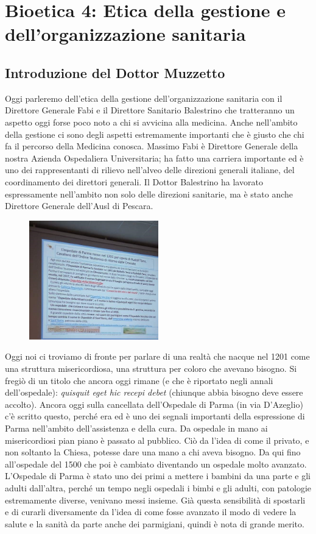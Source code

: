 \section{Bioetica 4: Etica della gestione e dell'organizzazione sanitaria}

\subsection{Introduzione del Dottor Muzzetto}

Oggi parleremo dell'etica della gestione dell'organizzazione sanitaria
con il Direttore Generale Fabi e il Direttore Sanitario Balestrino che
tratteranno un aspetto oggi forse poco noto a chi si avvicina alla
medicina. Anche nell'ambito della gestione ci sono degli aspetti
estremamente importanti che è giusto che chi fa il percorso della
Medicina conosca. Massimo Fabi è Direttore Generale della nostra Azienda
Ospedaliera Universitaria; ha fatto una carriera importante ed è uno dei
rappresentanti di rilievo nell'alveo delle direzioni generali italiane,
del coordinamento dei direttori generali. Il Dottor Balestrino ha
lavorato espressamente nell'ambito non solo delle direzioni sanitarie,
ma è stato anche Direttore Generale dell'Ausl di Pescara.

 \begin{figure}[!ht]
\centering
	\includegraphics[width=0.5\textwidth]{32/image1.jpeg}
	\end{figure}

Oggi noi ci troviamo di fronte per parlare di una realtà che nacque nel
1201 come una struttura misericordiosa, una struttura per coloro che
avevano bisogno. Si fregiò di un titolo che ancora oggi rimane (e che è
riportato negli annali dell'ospedale): \emph{quisquit eget hic recepi
debet} (chiunque abbia bisogno deve essere accolto). Ancora oggi sulla
cancellata dell'Ospedale di Parma (in via D'Azeglio) c'è scritto questo,
perché era ed è uno dei segnali importanti della espressione di Parma
nell'ambito dell'assistenza e della cura. Da ospedale in mano ai
misericordiosi pian piano è passato al pubblico. Ciò da l'idea di come
il privato, e non soltanto la Chiesa, potesse dare una mano a chi aveva
bisogno. Da qui fino all'ospedale del 1500 che poi è cambiato diventando
un ospedale molto avanzato. L'Ospedale di Parma è stato uno dei primi a
mettere i bambini da una parte e gli adulti dall'altra, perché un tempo
negli ospedali i bimbi e gli adulti, con patologie estremamente diverse,
venivano messi insieme. Già questa sensibilità di spostarli e di curarli
diversamente da l'idea di come fosse avanzato il modo di vedere la
salute e la sanità da parte anche dei parmigiani, quindi è nota di
grande merito.

